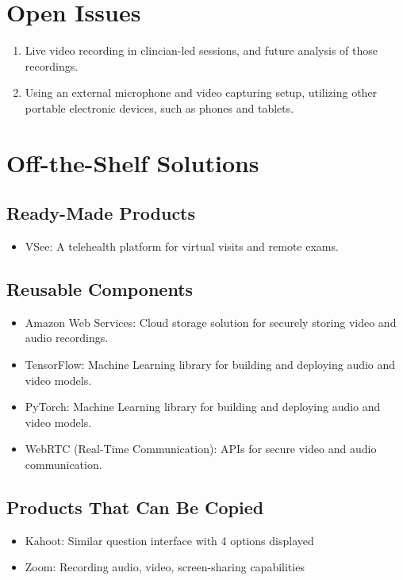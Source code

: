 \documentclass[12pt]{article}
\begin{document}
\newpage

\section{Open Issues}
\begin{enumerate}
  \item Live video recording in clincian-led sessions, and future analysis of those recordings.
  \item Using an external microphone and video capturing setup, utilizing other portable electronic devices, such as phones and tablets.
\end{enumerate}

\section{Off-the-Shelf Solutions}
\subsection{Ready-Made Products}
\begin{itemize}
  \item VSee: A telehealth platform for virtual visits and remote exams.
\end{itemize}
\subsection{Reusable Components}
\begin{itemize}
  \item Amazon Web Services: Cloud storage solution for securely storing video and audio recordings. 
  \item TensorFlow: Machine Learning library for building and deploying audio and video models.
  \item PyTorch: Machine Learning library for building and deploying audio and video models.
  \item WebRTC (Real-Time Communication): APIs for secure video and audio communication.
\end{itemize}
\subsection{Products That Can Be Copied}
\begin{itemize}
  \item Kahoot: Similar question interface with 4 options displayed
  \item Zoom: Recording audio, video, screen-sharing capabilities
\end{itemize}
\end{document}
